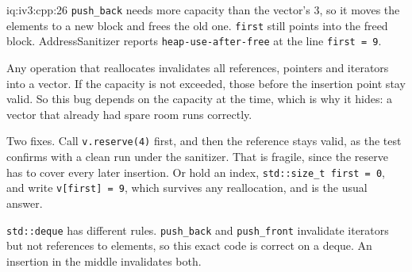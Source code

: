 \begin{solution}{iq:iv3:cpp:26}
\texttt{push\_back} needs more capacity than the vector's 3, so it moves the elements to a new block and frees the old one. \texttt{first} still points into the freed block. AddressSanitizer reports \texttt{heap-use-after-free} at the line \texttt{first = 9}.

Any operation that reallocates invalidates all references, pointers and iterators into a vector. If the capacity is not exceeded, those before the insertion point stay valid. So this bug depends on the capacity at the time, which is why it hides: a vector that already had spare room runs correctly.

Two fixes. Call \texttt{v.reserve(4)} first, and then the reference stays valid, as the test confirms with a clean run under the sanitizer. That is fragile, since the reserve has to cover every later insertion. Or hold an index, \texttt{std::size\_t first = 0}, and write \texttt{v[first] = 9}, which survives any reallocation, and is the usual answer.

\texttt{std::deque} has different rules. \texttt{push\_back} and \texttt{push\_front} invalidate iterators but not references to elements, so this exact code is correct on a deque. An insertion in the middle invalidates both.

\end{solution}

